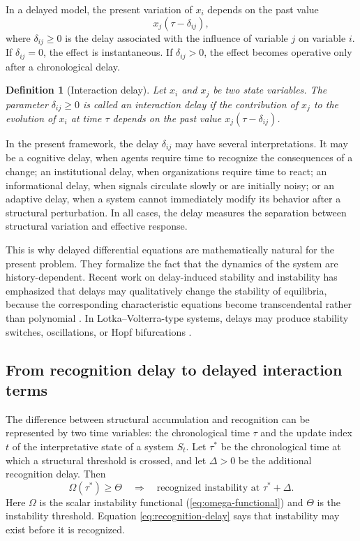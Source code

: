 \documentclass[11pt]{article}
\newtheorem{definition}{Definition}
\def\eq#1{(\ref{#1})}
\begin{document}
In a delayed model, the present variation of $x_i$ depends on the past value
\[
x_j(\tau-\delta_{ij}),
\]
where $\delta_{ij}\geq 0$ is the delay associated with the influence of variable
$j$ on variable $i$. If $\delta_{ij}=0$, the effect is instantaneous. If
$\delta_{ij}>0$, the effect becomes operative only after a chronological delay.

\begin{definition}[Interaction delay]
	Let $x_i$ and $x_j$ be two state variables. The parameter $\delta_{ij}\geq 0$ is
	called an interaction delay if the contribution of $x_j$ to the evolution of
	$x_i$ at time $\tau$ depends on the past value $x_j(\tau-\delta_{ij})$.
\end{definition}

In the present framework, the delay $\delta_{ij}$ may have several
interpretations. It may be a cognitive delay, when agents require time to
recognize the consequences of a change; an institutional delay, when
organizations require time to react; an informational delay, when signals
circulate slowly or are initially noisy; or an adaptive delay, when a system
cannot immediately modify its behavior after a structural perturbation. In all
cases, the delay measures the separation between structural variation and
effective response.

This is why delayed differential equations are mathematically natural for the
present problem. They formalize the fact that the dynamics of the system are
history-dependent. Recent work on delay-induced stability and instability has
emphasized that delays may qualitatively change the stability of equilibria,
because the corresponding characteristic equations become transcendental rather
than polynomial \cite{menon2021delayinduced}. In Lotka--Volterra-type systems,
delays may produce stability switches, oscillations, or Hopf bifurcations
\cite{xu2022delayedlv,lifan2024twodelay,li2022memorydiffusion}.


\subsection{From recognition delay to delayed interaction terms}

The difference between structural accumulation and recognition can be represented
by two time variables: the chronological time $\tau$ and the update index $t$ of the interpretative state of a system $S_t$. Let $\tau^\ast$ be the chronological time at which a structural
threshold is crossed, and let $\Delta>0$ be the additional recognition delay.
Then
\begin{equation}
\Omega(\tau^\ast)\geq \Theta
\quad\Longrightarrow\quad
\text{recognized instability at } \tau^\ast+\Delta.
\label{eq:recognition-delay}
\end{equation}
Here $\Omega$ is the  scalar instability functional \eq{eq:omega-functional} and $\Theta$ is the instability
threshold. Equation \eqref{eq:recognition-delay} says that instability may exist
before it is recognized.
\end{document}
